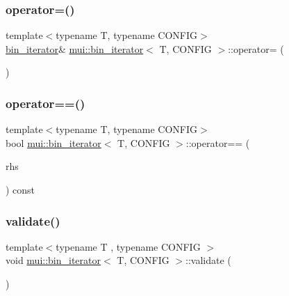 \subsubsection{\texorpdfstring{operator=()}{operator=()}}
{\footnotesize\ttfamily template$<$typename T, typename C\+O\+N\+F\+IG$>$ \\
\hyperlink{structmui_1_1bin__iterator}{bin\+\_\+iterator}\& \hyperlink{structmui_1_1bin__iterator}{mui\+::bin\+\_\+iterator}$<$ T, C\+O\+N\+F\+IG $>$\+::operator= (\begin{DoxyParamCaption}\item[{const \hyperlink{structmui_1_1bin__iterator}{bin\+\_\+iterator}$<$ T, C\+O\+N\+F\+IG $>$ \&}]{ }\end{DoxyParamCaption})\hspace{0.3cm}{\ttfamily [default]}}

\mbox{\label{structmui_1_1bin__iterator_a12ed131569425fd91bd853eef3dd45ef}} 
\subsubsection{\texorpdfstring{operator==()}{operator==()}}
{\footnotesize\ttfamily template$<$typename T, typename C\+O\+N\+F\+IG$>$ \\
bool \hyperlink{structmui_1_1bin__iterator}{mui\+::bin\+\_\+iterator}$<$ T, C\+O\+N\+F\+IG $>$\+::operator== (\begin{DoxyParamCaption}\item[{const \hyperlink{structmui_1_1bin__iterator}{bin\+\_\+iterator}$<$ T, C\+O\+N\+F\+IG $>$ \&}]{rhs }\end{DoxyParamCaption}) const\hspace{0.3cm}{\ttfamily [inline]}}

\mbox{\label{structmui_1_1bin__iterator_add20c0285e60fb2bd9e7b82bb9fb4204}} 
\subsubsection{\texorpdfstring{validate()}{validate()}}
{\footnotesize\ttfamily template$<$typename T , typename C\+O\+N\+F\+IG $>$ \\
void \hyperlink{structmui_1_1bin__iterator}{mui\+::bin\+\_\+iterator}$<$ T, C\+O\+N\+F\+IG $>$\+::validate (\begin{DoxyParamCaption}{ }\end{DoxyParamCaption})\hspace{0.3cm}{\ttfamily [inline]}}



